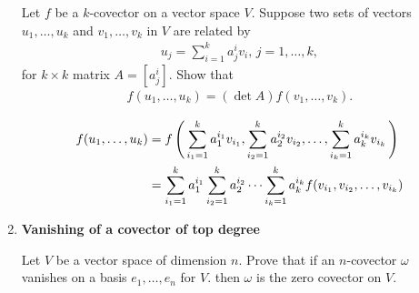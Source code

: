 \documentclass[10pt,a4paper]{report}
\newcommand{\BLUE}[1]{\textcolor{blue}{#1}}
\begin{document}
\begin{enumerate}[label=3.\arabic*.]
	Let $f$ be a $k$-covector on a vector space $V$.  Suppose two sets of vectors $u_1, \dots, u_k$ and $v_1, \dots, v_k$ in $V$ are related by 
		\begin{align*}
			u_j =\sum_{i=1}^k a_j^iv_i,\, j=1,\dots,k,
		\end{align*}for $k\times k$ matrix $A=[a_j^i]$.  Show that 
		\begin{align*}
			f(u_1,\dots,u_k)=(\det A)f(v_1,\dots, v_k).
		\end{align*}
		
	\BLUE{\begin{align*}
			f(u_1,\dots,u_k) &= f\left (\, \sum_{i_1=1}^k a_1^{i_1}v_{i_1}, \sum_{i_2=1}^k a_2^{i_2}v_{i_2}, \dots, \sum_{{i_k}=1}^k a_k^{i_k}v_{i_k} \,\right ) \\
			&= \sum_{i_1=1}^k a_1^{i_1} \sum_{i_2=1}^k a_2^{i_2} \cdots \sum_{{i_k}=1}^k a_k^{i_k} f(v_{i_1},v_{i_2}, \dots,v_{i_k})
		\end{align*}	
		}
	
	\item \textbf{Vanishing of a covector of top degree}
	
	Let $V$ be a vector space of dimension $n$.  Prove that if an $n$-covector $\omega$ vanishes on a basis $e_1,\dots,e_n$ for $V$.  then $\omega$ is the zero covector on $V$.

\end{enumerate}
\end{document}
